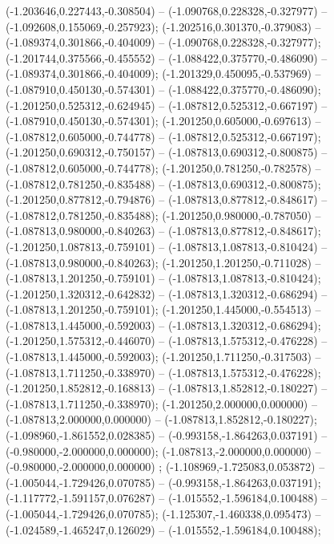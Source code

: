  (-1.203646,0.227443,-0.308504) -- (-1.090768,0.228328,-0.327977) -- (-1.092608,0.155069,-0.257923);
 (-1.202516,0.301370,-0.379083) -- (-1.089374,0.301866,-0.404009) -- (-1.090768,0.228328,-0.327977);
 (-1.201744,0.375566,-0.455552) -- (-1.088422,0.375770,-0.486090) -- (-1.089374,0.301866,-0.404009);
 (-1.201329,0.450095,-0.537969) -- (-1.087910,0.450130,-0.574301) -- (-1.088422,0.375770,-0.486090);
 (-1.201250,0.525312,-0.624945) -- (-1.087812,0.525312,-0.667197) -- (-1.087910,0.450130,-0.574301);
 (-1.201250,0.605000,-0.697613) -- (-1.087812,0.605000,-0.744778) -- (-1.087812,0.525312,-0.667197);
 (-1.201250,0.690312,-0.750157) -- (-1.087813,0.690312,-0.800875) -- (-1.087812,0.605000,-0.744778);
 (-1.201250,0.781250,-0.782578) -- (-1.087812,0.781250,-0.835488) -- (-1.087813,0.690312,-0.800875);
 (-1.201250,0.877812,-0.794876) -- (-1.087813,0.877812,-0.848617) -- (-1.087812,0.781250,-0.835488);
 (-1.201250,0.980000,-0.787050) -- (-1.087813,0.980000,-0.840263) -- (-1.087813,0.877812,-0.848617);
 (-1.201250,1.087813,-0.759101) -- (-1.087813,1.087813,-0.810424) -- (-1.087813,0.980000,-0.840263);
 (-1.201250,1.201250,-0.711028) -- (-1.087813,1.201250,-0.759101) -- (-1.087813,1.087813,-0.810424);
 (-1.201250,1.320312,-0.642832) -- (-1.087813,1.320312,-0.686294) -- (-1.087813,1.201250,-0.759101);
 (-1.201250,1.445000,-0.554513) -- (-1.087813,1.445000,-0.592003) -- (-1.087813,1.320312,-0.686294);
 (-1.201250,1.575312,-0.446070) -- (-1.087813,1.575312,-0.476228) -- (-1.087813,1.445000,-0.592003);
 (-1.201250,1.711250,-0.317503) -- (-1.087813,1.711250,-0.338970) -- (-1.087813,1.575312,-0.476228);
 (-1.201250,1.852812,-0.168813) -- (-1.087813,1.852812,-0.180227) -- (-1.087813,1.711250,-0.338970);
 (-1.201250,2.000000,0.000000) -- (-1.087813,2.000000,0.000000) -- (-1.087813,1.852812,-0.180227);
 (-1.098960,-1.861552,0.028385) -- (-0.993158,-1.864263,0.037191) -- (-0.980000,-2.000000,0.000000);
 (-1.087813,-2.000000,0.000000) -- (-0.980000,-2.000000,0.000000) ;
 (-1.108969,-1.725083,0.053872) -- (-1.005044,-1.729426,0.070785) -- (-0.993158,-1.864263,0.037191);
 (-1.117772,-1.591157,0.076287) -- (-1.015552,-1.596184,0.100488) -- (-1.005044,-1.729426,0.070785);
 (-1.125307,-1.460338,0.095473) -- (-1.024589,-1.465247,0.126029) -- (-1.015552,-1.596184,0.100488);

